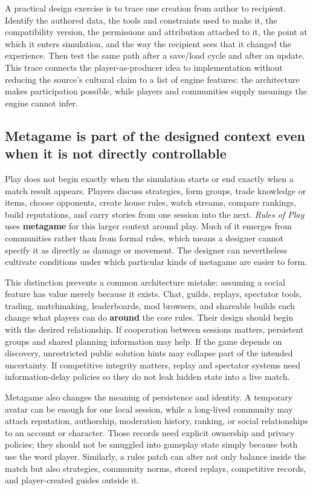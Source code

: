 A practical design exercise is to trace one creation from author to recipient. Identify the authored data, the tools and constraints used to make it, the compatibility version, the permissions and attribution attached to it, the point at which it enters simulation, and the way the recipient sees that it changed the experience. Then test the same path after a save/load cycle and after an update. This trace connects the player-as-producer idea to implementation without reducing the source's cultural claim to a list of engine features: the architecture makes participation possible, while players and communities supply meanings the engine cannot infer.

\subsection{Metagame is part of the designed context even when it is not directly controllable}\label{06-engine-ii-ch046-metagame-is-part-of-the-designed-context-even-when-it-is-not-directly-controllable}

Play does not begin exactly when the simulation starts or end exactly when a match result appears. Players discuss strategies, form groups, trade knowledge or items, choose opponents, create house rules, watch streams, compare rankings, build reputations, and carry stories from one session into the next. \emph{Rules of Play} uses \textbf{metagame} for this larger context around play. Much of it emerges from communities rather than from formal rules, which means a designer cannot specify it as directly as damage or movement. The designer can nevertheless cultivate conditions under which particular kinds of metagame are easier to form.

This distinction prevents a common architecture mistake: assuming a social feature has value merely because it exists. Chat, guilds, replays, spectator tools, trading, matchmaking, leaderboards, mod browsers, and shareable builds each change what players can do \textbf{around} the core rules. Their design should begin with the desired relationship. If cooperation between sessions matters, persistent groups and shared planning information may help. If the game depends on discovery, unrestricted public solution hints may collapse part of the intended uncertainty. If competitive integrity matters, replay and spectator systems need information-delay policies so they do not leak hidden state into a live match.

Metagame also changes the meaning of persistence and identity. A temporary avatar can be enough for one local session, while a long-lived community may attach reputation, authorship, moderation history, ranking, or social relationships to an account or character. Those records need explicit ownership and privacy policies; they should not be smuggled into gameplay state simply because both use the word player. Similarly, a rules patch can alter not only balance inside the match but also strategies, community norms, stored replays, competitive records, and player-created guides outside it.

